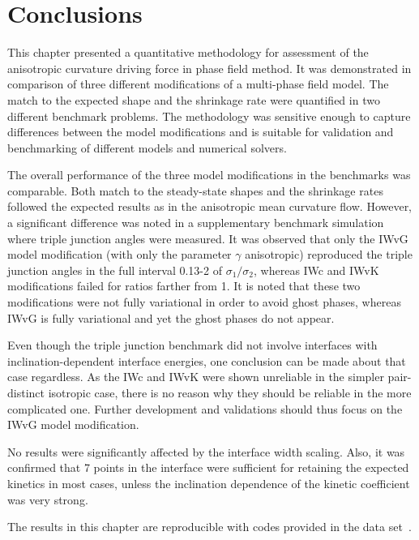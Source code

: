 \section{Conclusions}
This chapter presented a quantitative methodology for assessment of the anisotropic curvature driving force in phase field method. It was demonstrated in comparison of three different modifications of a multi-phase field model. The match to the expected shape and the shrinkage rate were quantified in two different benchmark problems. The methodology was sensitive enough to capture differences between the model modifications and is suitable for validation and benchmarking of different models and numerical solvers.

The overall performance of the three model modifications in the benchmarks was comparable. Both match to the steady-state shapes and the shrinkage rates followed the expected results as in the anisotropic mean curvature flow. However, a significant difference was noted in a supplementary benchmark simulation where triple junction angles were measured. It was observed that only the IWvG model modification (with only the parameter $\gamma$ anisotropic) reproduced the triple junction angles in the full interval 0.13-2 of $\sigma_1/\sigma_2$, whereas IWc and IWvK modifications failed for ratios farther from 1. It is noted that these two modifications were not fully variational in order to avoid ghost phases, whereas IWvG is fully variational and yet the ghost phases do not appear.

Even though the triple junction benchmark did not involve interfaces with inclination-dependent interface energies, one conclusion can be made about that case regardless. As the IWc and IWvK were shown unreliable in the simpler pair-distinct isotropic case, there is no reason why they should be reliable in the more complicated one. Further development and validations should thus focus on the IWvG model modification.


No results were significantly affected by the interface width scaling. Also, it was confirmed that 7 points in the interface were sufficient for retaining the expected kinetics in most cases, unless the inclination dependence of the kinetic coefficient was very strong.

The results in this chapter are reproducible with codes provided in the data set~\cite{Minar2022dataset}.
	
	
	
